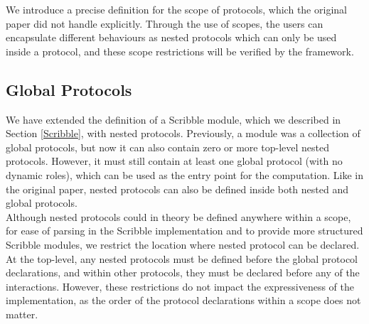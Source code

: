 \documentclass[12pt,twoside]{report}
\begin{document}
We introduce a precise definition for the scope of protocols, which the original paper did not handle explicitly. Through the use of scopes, the users can encapsulate different behaviours as nested protocols which can only be used inside a protocol, and these scope restrictions will be verified by the framework.\\

\subsection{Global Protocols}\label{scr-global-protocols}

We have extended the definition of a Scribble module, which we described in Section \ref{Scribble}, with nested protocols. Previously, a module was a collection of global protocols, but now it can also contain zero or more top-level nested protocols. However, it must still contain at least one global protocol (with no dynamic roles), which can be used as the entry point for the computation. Like in the original paper\cite{nestedprotocols}, nested protocols can also be defined inside both nested and global protocols.\\

Although nested protocols could in theory be defined anywhere within a scope, for ease of parsing in the Scribble implementation and to provide more structured Scribble modules, we restrict the location where nested protocol can be declared. At the top-level, any nested protocols must be defined before the global protocol declarations, and within other protocols, they must be declared before any of the interactions. However, these restrictions do not impact the expressiveness of the implementation, as the order of the protocol declarations within a scope does not matter.\\
\end{document}

